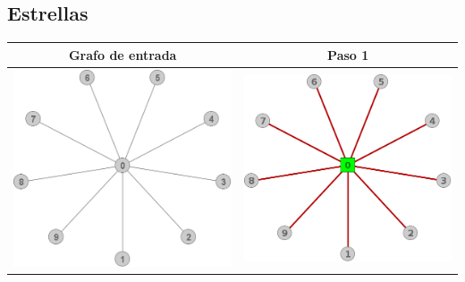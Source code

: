 \subsection{Estrellas}
	\begin{center}
		\begin{tabular}{ |c||c| }
			\hline
			Grafo de entrada & Paso 1 \\
			\hline\hline
			\includegraphics[scale = 0.25]{img/ej3/constructiva_golosa/Star_st0.png} &
			\includegraphics[scale = 0.25]{img/ej3/constructiva_golosa/Star_st1.png} \\

\end{tabular}
\end{center}
